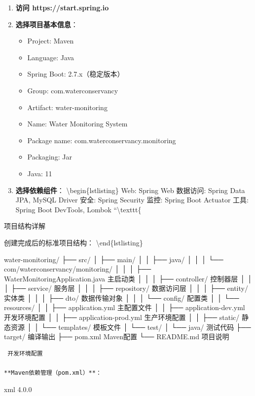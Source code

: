 \begin{enumerate}
\def\labelenumi{\arabic{enumi}.}
\tightlist
\item
  \textbf{访问 https://start.spring.io}
\item
  \textbf{选择项目基本信息}：

  \begin{itemize}
  \tightlist
  \item
    Project: Maven
  \item
    Language: Java
  \item
    Spring Boot: 2.7.x（稳定版本）
  \item
    Group: com.waterconservancy
  \item
    Artifact: water-monitoring
  \item
    Name: Water Monitoring System
  \item
    Package name: com.waterconservancy.monitoring
  \item
    Packaging: Jar
  \item
    Java: 11
  \end{itemize}
\item
  \textbf{选择依赖组件}： \textbackslash begin\{lstlisting\} Web: Spring Web 数据访问: Spring Data JPA, MySQL Driver 安全: Spring Security 监控: Spring Boot Actuator 工具: Spring Boot DevTools, Lombok ``\textbackslash texttt\{
\end{enumerate}

 项目结构详解

创建完成后的标准项目结构： \textbackslash end\{lstlisting\}

water-monitoring/ ├── src/ │ ├── main/ │ │ ├── java/ │ │ │ └── com/waterconservancy/monitoring/ │ │ │ ├── WaterMonitoringApplication.java  主启动类 │ │ │ ├── controller/  控制器层 │ │ │ ├── service/  服务层 │ │ │ ├── repository/  数据访问层 │ │ │ ├── entity/  实体类 │ │ │ ├── dto/  数据传输对象 │ │ │ └── config/  配置类 │ │ └── resources/ │ │ ├── application.yml  主配置文件 │ │ ├── application-dev.yml  开发环境配置 │ │ ├── application-prod.yml  生产环境配置 │ │ ├── static/  静态资源 │ │ └── templates/  模板文件 │ └── test/ │ └── java/  测试代码 ├── target/  编译输出 ├── pom.xml  Maven配置 └── README.md  项目说明

\begin{lstlisting}
 开发环境配置

**Maven依赖管理（pom.xml）**：
\end{lstlisting}

xml 4.0.0

